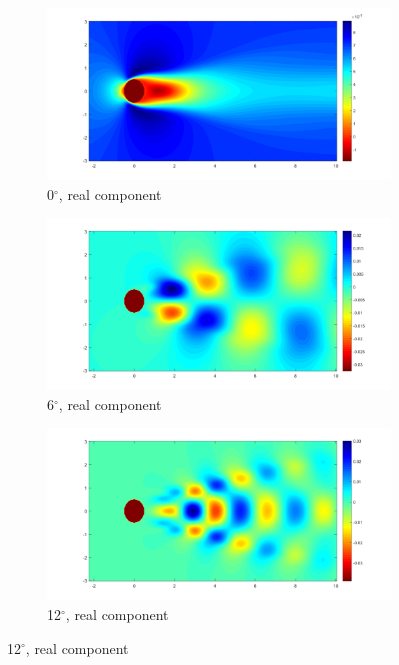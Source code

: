 \documentclass[letterpaper,12pt,peerreviewca,draftcls]{IEEEtran}
\begin{document}
\begin{figure}[h]
\begin{subfigure}[t]{0.30\textwidth}
	\end{subfigure}
	\begin{subfigure}[t]{0.30\textwidth}
		\includegraphics[width=\linewidth]{"Figure 16g"}
		\caption{0$^\circ$, real component}
	\end{subfigure}	
	\begin{subfigure}[t]{0.30\textwidth}
		\includegraphics[width=\linewidth]{"Figure 16h"}
		\caption{6$^\circ$, real component}
	\end{subfigure}
	\begin{subfigure}[t]{0.30\textwidth}
		\includegraphics[width=\linewidth]{"Figure 16i"}
		\caption{12$^\circ$, real component}

\end{subfigure}
\end{figure}
\end{document}
